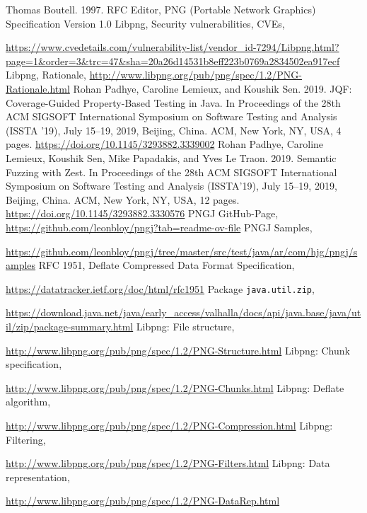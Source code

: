 \documentclass[runningheads]{llncs}
\begin{document}
%
%
%
% 
% 
%
\begin{thebibliography}{8}
Thomas Boutell. 1997. RFC Editor, PNG (Portable Network Graphics) Specification Version 1.0
Libpng, Security vulnerabilities, CVEs,

\url{https://www.cvedetails.com/vulnerability-list/vendor\_id-7294/Libpng.html?page=1\&order=3\&trc=47\&sha=20a26d14531b8eff223b0769a2834502ea917ecf}
Libpng, Rationale,
\url{http://www.libpng.org/pub/png/spec/1.2/PNG-Rationale.html}
Rohan Padhye, Caroline Lemieux, and Koushik Sen. 2019. JQF: Coverage-Guided Property-Based Testing in Java. In Proceedings of the 28th ACM SIGSOFT International Symposium on Software Testing and Analysis (ISSTA ’19), July 15–19, 2019, Beijing, China. ACM, New York, NY, USA, 4 pages. \url{https://doi.org/10.1145/3293882.3339002}
Rohan Padhye, Caroline Lemieux, Koushik Sen, Mike Papadakis, and Yves Le Traon. 2019. Semantic Fuzzing with Zest. In Proceedings of the 28th ACM SIGSOFT International Symposium on Software Testing and Analysis (ISSTA’19), July 15–19, 2019, Beijing, China. ACM, New York, NY, USA, 12 pages. \url{https://doi.org/10.1145/3293882.3330576}
PNGJ GitHub-Page, \url{https://github.com/leonbloy/pngj?tab=readme-ov-file}
PNGJ Samples, 

\url{https://github.com/leonbloy/pngj/tree/master/src/test/java/ar/com/hjg/pngj/samples}
RFC 1951, Deflate Compressed Data Format Specification,

\url{https://datatracker.ietf.org/doc/html/rfc1951}
Package \texttt{java.util.zip},

\url{https://download.java.net/java/early\_access/valhalla/docs/api/java.base/java/util/zip/package-summary.html}
Libpng: File structure,

\url{http://www.libpng.org/pub/png/spec/1.2/PNG-Structure.html}
Libpng: Chunk specification, 

\url{http://www.libpng.org/pub/png/spec/1.2/PNG-Chunks.html}
Libpng: Deflate algorithm,

\url{http://www.libpng.org/pub/png/spec/1.2/PNG-Compression.html}
Libpng: Filtering,

\url{http://www.libpng.org/pub/png/spec/1.2/PNG-Filters.html}
Libpng: Data representation,

\url{http://www.libpng.org/pub/png/spec/1.2/PNG-DataRep.html}
\end{thebibliography}
\end{document}
